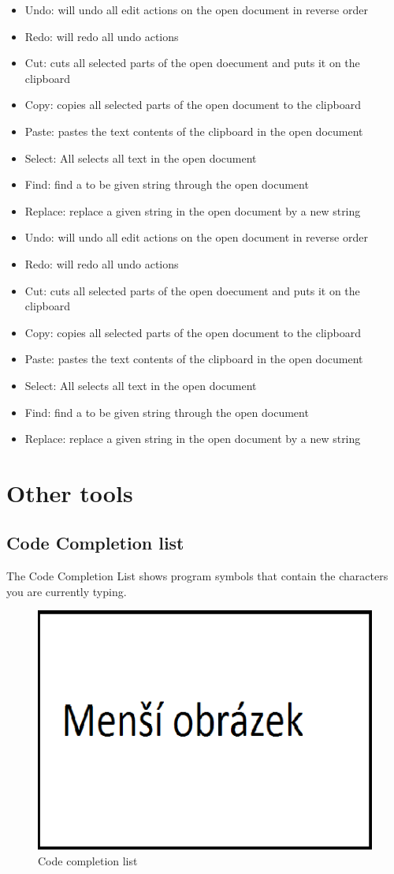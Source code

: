     \clearpage

    \begin{itemize}
        \item Undo: will undo all edit actions on the open document in reverse order
        \item Redo: will redo all undo actions
        \item Cut: cuts all selected parts of the open doecument and puts it on the clipboard
        \item Copy: copies all selected parts of the open document to the clipboard
        \item Paste: pastes the text contents of the clipboard in the open document
        \item Select: All selects all text in the open document
        \item Find: find a to be given string through the open document
        \item Replace: replace a given string in the open document by a new string
    \end{itemize}

    \begin{itemize}
        \item Undo: will undo all edit actions on the open document in reverse order
        \item Redo: will redo all undo actions
        \item Cut: cuts all selected parts of the open doecument and puts it on the clipboard
        \item Copy: copies all selected parts of the open document to the clipboard
        \item Paste: pastes the text contents of the clipboard in the open document
        \item Select: All selects all text in the open document
        \item Find: find a to be given string through the open document
        \item Replace: replace a given string in the open document by a new string
    \end{itemize}

\section{Other tools}

\subsection{Code Completion list}
    The Code Completion List shows program symbols that contain the characters you are currently typing.
    \begin{figure}[h]
        \centering{}
        \includegraphics[width=.3\textwidth]{img/mensi_obrazek.png}
        \caption{Code completion list}
    \end{figure}

